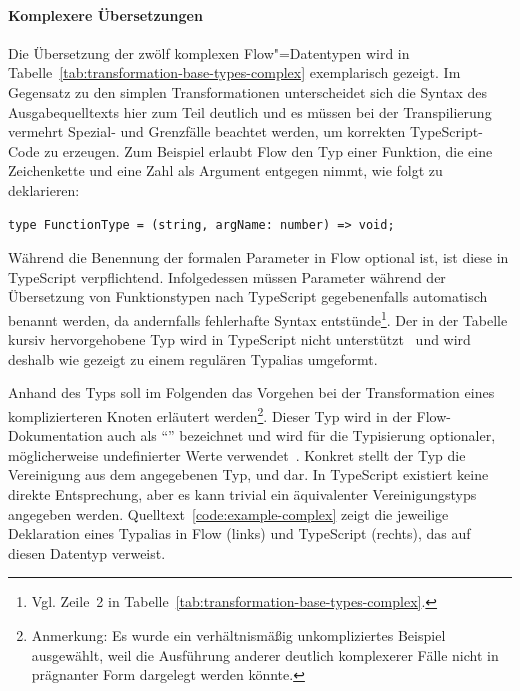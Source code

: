 \vspace{-0.5\baselineskip}
\paragraph{Komplexere Übersetzungen}

Die Übersetzung der zwölf komplexen Flow"=Datentypen wird in Tabelle~\ref{tab:transformation-base-types-complex} exemplarisch gezeigt. Im Gegensatz zu den simplen Transformationen unterscheidet sich die Syntax des Ausgabequelltexts hier zum Teil deutlich und es müssen bei der Transpilierung vermehrt Spezial- und Grenzfälle beachtet werden, um korrekten TypeScript-Code zu erzeugen. Zum Beispiel erlaubt Flow den Typ einer Funktion, die eine Zeichenkette und eine Zahl als Argument entgegen nimmt, wie folgt zu deklarieren:

\begin{lstlisting}[numbers=none]
type FunctionType = (string, argName: number) => void;
\end{lstlisting}

Während die Benennung der formalen Parameter in Flow optional ist, ist diese in TypeScript verpflichtend. Infolgedessen müssen Parameter während der Übersetzung von Funktionstypen nach TypeScript gegebenenfalls automatisch benannt werden, da andernfalls fehlerhafte Syntax entstünde\footnote{Vgl. Zeile~2 in Tabelle~\ref{tab:transformation-base-types-complex}.}.
Der in der Tabelle kursiv hervorgehobene Typ  wird in TypeScript nicht unterstützt~\autocite{TS:GITHUB:NO_OPAQUE_TYPE} und wird deshalb wie gezeigt zu einem regulären Typalias umgeformt.



Anhand des Typs  soll im Folgenden das Vorgehen bei der Transformation eines komplizierteren Knoten erläutert werden\footnote{Anmerkung: Es wurde ein verhältnismäßig unkompliziertes Beispiel ausgewählt, weil die Ausführung anderer deutlich komplexerer Fälle nicht in prägnanter Form dargelegt werden könnte.}. Dieser Typ wird in der Flow-Dokumentation auch als \enquote{} bezeichnet und wird für die Typisierung optionaler, möglicherweise undefinierter Werte verwendet~\autocite{FLOW:MAYBE_TYPES}. Konkret stellt der Typ die Vereinigung aus dem angegebenen Typ,  und  dar. In TypeScript existiert keine direkte Entsprechung, aber es kann trivial ein äquivalenter Vereinigungstyps angegeben werden. Quelltext~\ref{code:example-complex} zeigt die jeweilige Deklaration eines Typalias in Flow (links) und TypeScript (rechts), das auf diesen Datentyp verweist.

